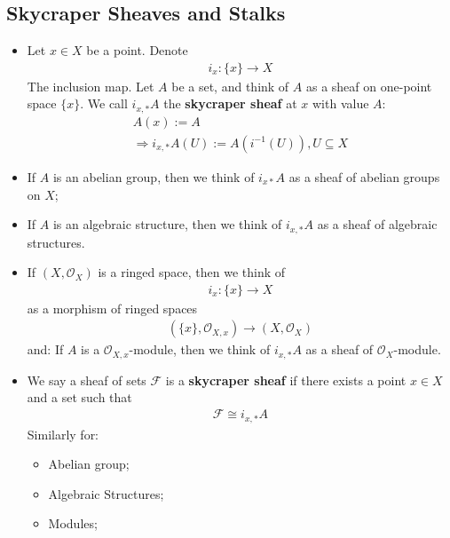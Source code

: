 \documentclass[Total.tex]{subfiles}
\begin{document}
			\subsection{Skycraper Sheaves and Stalks}
				\begin{Def}
					\begin{itemize}
						\item Let $x\in X$ be a point. Denote
						\begin{gather*}
							i_x:\{x\}\rightarrow X
						\end{gather*}
						The inclusion map. Let $A$ be a set, and think of $A$ as a sheaf on one-point space $\{x\}$. We call $i_{x,*}A$ the \textbf{skycraper sheaf} at $x$ with value $A$: 
						\begin{gather*}
							A(x):=A\\
							\Rightarrow i_{x,*}A(U):=A(i^{-1}(U)),U\subseteq X
						\end{gather*}
						\item If $A$ is an abelian group, then we think of $i_{x*} A$ as a sheaf of abelian groups on $X$;
						\item If $A$ is an algebraic structure, then we think of $i_{x,*}A$ as a sheaf of algebraic structures.
						\item If $(X,\mathcal{O}_X)$ is a ringed space, then we think of
						\begin{gather*}
							i_x:\{x\}\rightarrow X
						\end{gather*}
						as a morphism of ringed spaces
						\begin{gather*}
							(\{x\},\mathcal{O}_{X,x})\rightarrow (X,\mathcal{O}_X)
						\end{gather*}
						and: If $A$ is a $\mathcal{O}_{X,x}$-module, then we think of $i_{x,*}A$ as a sheaf of $\mathcal{O}_{X}$-module.
						\item We say a sheaf of sets $\mathcal{F}$ is a \textbf{skycraper sheaf} if there exists a point $x\in X$ and a set such that
						\begin{gather*}
							\mathcal{F}\cong i_{x,*}A
						\end{gather*}
						Similarly for:
						\begin{itemize}
							\item Abelian group;
							\item Algebraic Structures;
							\item Modules;
						\end{itemize}
					\end{itemize}
				\end{Def}
\end{document}
